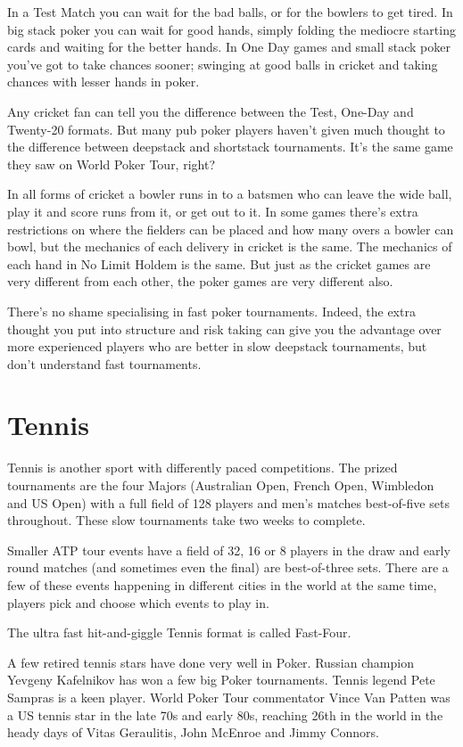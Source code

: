 In a Test Match you can wait for the bad balls, or for the bowlers to
get tired. In big stack poker you can wait for good hands, simply folding the
mediocre starting cards and waiting for the better hands. In One Day games
and small stack poker you've got to take chances sooner; swinging at
good balls in cricket and taking chances with lesser hands in poker.

Any cricket fan can tell you the difference between the Test,
One-Day and Twenty-20 formats. But many pub poker players haven't given
much thought to the difference between deepstack and shortstack
tournaments. It's the same game they saw on World Poker Tour,
right?

In all forms of cricket a bowler runs in to a batsmen who
can leave the wide ball, play it and score runs from it, or get out
to it. In some games there's extra restrictions on where the
fielders can be placed and how many overs a bowler
can bowl, but the mechanics of each delivery in cricket is the same.
The mechanics of each hand in No Limit Holdem is the same.
But just as the cricket games are very different from each other, the
poker games are very different also.

There's no shame specialising in fast poker tournaments. Indeed,
the extra thought you put into structure and risk taking can give
you the advantage over more experienced players who are better in
slow deepstack tournaments, but don't understand fast tournaments.

\section{Tennis}

Tennis is another sport with differently paced competitions.
The prized tournaments are the four Majors (Australian Open,
French Open, Wimbledon and US Open) with a full field of 128 players
and men's matches best-of-five sets throughout. These slow tournaments
take two weeks to complete.

Smaller ATP tour events have a field of 32, 16 or 8 players in the draw
and early round matches (and sometimes even the final) are best-of-three
sets. There are a few of these events happening in different cities in
the world at the same time, players pick and choose which events
to play in.

The ultra fast hit-and-giggle Tennis format is called Fast-Four.

A few retired tennis stars have done very well in Poker. Russian
champion Yevgeny Kafelnikov has won a few big Poker tournaments.
Tennis legend Pete Sampras is a keen player. World Poker Tour
commentator Vince Van Patten was a US tennis star in the late
70s and early 80s, reaching 26th in the world in the heady days
of Vitas Geraulitis, John McEnroe and Jimmy Connors.

